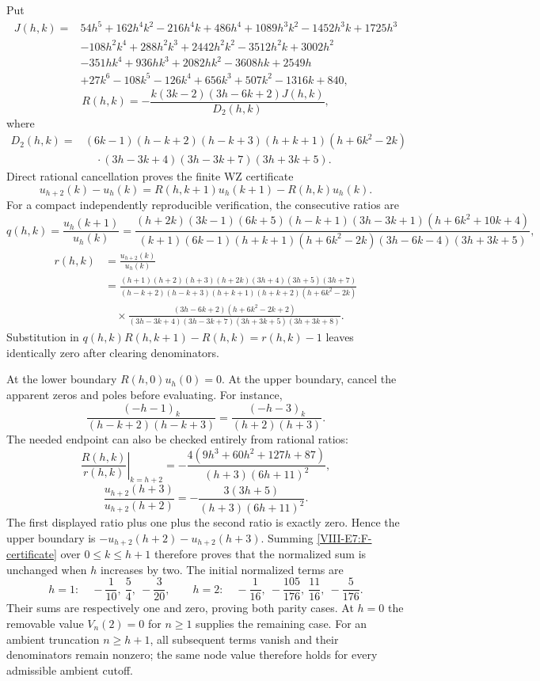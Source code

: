 \documentclass[11pt,letterpaper]{article}
\numberwithin{equation}{section}
\begin{document}
Put
\begin{align*}
 J(h,k)={}&54h^5+162h^4k^2-216h^4k+486h^4
 +1089h^3k^2-1452h^3k+1725h^3\\
 &-108h^2k^4+288h^2k^3+2442h^2k^2-3512h^2k+3002h^2\\
 &-351hk^4+936hk^3+2082hk^2-3608hk+2549h\\
 &+27k^6-108k^5-126k^4+656k^3+507k^2-1316k+840,
\end{align*}
\[
 R(h,k)=-\frac{k(3k-2)(3h-6k+2)J(h,k)}{D_2(h,k)},
\]
where
\begin{align*}
 D_2(h,k)={}&(6k-1)(h-k+2)(h-k+3)(h+k+1)(h+6k^2-2k)\\
 &\quad\cdot(3h-3k+4)(3h-3k+7)(3h+3k+5).
\end{align*}
Direct rational cancellation proves the finite WZ certificate
\begin{equation}\label{VIII-E7:F-certificate}
 u_{h+2}(k)-u_h(k)
 =R(h,k+1)u_h(k+1)-R(h,k)u_h(k).
\end{equation}
For a compact independently reproducible verification, the consecutive
ratios are
\[
 q(h,k)=\frac{u_h(k+1)}{u_h(k)}
 =\frac{(h+2k)(3k-1)(6k+5)(h-k+1)(3h-3k+1)
 (h+6k^2+10k+4)}
 {(k+1)(6k-1)(h+k+1)(h+6k^2-2k)
 (3h-6k-4)(3h+3k+5)},
\]
\begin{align*}
 r(h,k)&=\frac{u_{h+2}(k)}{u_h(k)}\\
 &=\frac{(h+1)(h+2)(h+3)(h+2k)(3h+4)(3h+5)(3h+7)}
 {(h-k+2)(h-k+3)(h+k+1)(h+k+2)(h+6k^2-2k)}\\
 &\quad\times\frac{(3h-6k+2)(h+6k^2-2k+2)}
 {(3h-3k+4)(3h-3k+7)(3h+3k+5)(3h+3k+8)}.
\end{align*}
Substitution in $q(h,k)R(h,k+1)-R(h,k)=r(h,k)-1$ leaves
identically zero after clearing denominators.

At the lower boundary $R(h,0)u_h(0)=0$. At the upper boundary,
cancel the apparent zeros and poles before evaluating. For instance,
\[
 \frac{(-h-1)_k}{(h-k+2)(h-k+3)}
 =\frac{(-h-3)_k}{(h+2)(h+3)}.
\]
The needed endpoint can also be checked entirely from rational ratios:
\[
 \left.\frac{R(h,k)}{r(h,k)}\right|_{k=h+2}
 =-\frac{4(9h^3+60h^2+127h+87)}{(h+3)(6h+11)^2},
\]
\[
 \frac{u_{h+2}(h+3)}{u_{h+2}(h+2)}
 =-\frac{3(3h+5)}{(h+3)(6h+11)^2}.
\]
The first displayed ratio plus one plus the second ratio is exactly
zero. Hence the upper boundary is
$-u_{h+2}(h+2)-u_{h+2}(h+3)$. Summing
\eqref{VIII-E7:F-certificate} over $0\le k\le h+1$ therefore proves that
the normalized sum is unchanged when $h$ increases by two.
The initial normalized terms are
\[
 h=1:\quad -\frac1{10},\ \frac54,\ -\frac3{20},
 \qquad
 h=2:\quad-\frac1{16},\ -\frac{105}{176},\ \frac{11}{16},\ -\frac5{176}.
\]
Their sums are respectively one and zero, proving both parity cases.
At $h=0$ the removable value $V_n(2)=0$ for $n\ge1$ supplies the
remaining case. For an ambient truncation $n\ge h+1$, all subsequent
terms vanish and their denominators remain nonzero; the same node
value therefore holds for every admissible ambient cutoff.
\end{document}
